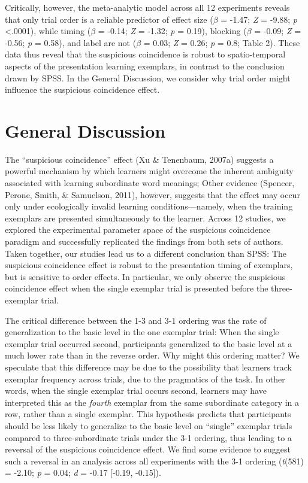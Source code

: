 \documentclass[english,floatsintext,man]{apa6}
\newcounter{author}
\theoremstyle{definition}
\theoremstyle{definition}
\theoremstyle{remark}
\begin{document}
Critically, however, the meta-analytic model across all 12 experiments
reveals that only trial order is a reliable predictor of effect size
(\(\beta\) = -1.47; \emph{Z} = -9.88; \emph{p} \textless{}.0001), while
timing (\(\beta\) = -0.14; \emph{Z} = -1.32; \emph{p} = 0.19), blocking
(\(\beta\) = -0.09; \emph{Z} = -0.56; \emph{p} = 0.58), and label are
not (\(\beta\) = 0.03; \emph{Z} = 0.26; \emph{p} = 0.8; Table 2). These
data thus reveal that the suspicious coincidence is robust to
spatio-temporal aspects of the presentation learning exemplars, in
contrast to the conclusion drawn by SPSS. In the General Discussion, we
consider why trial order might influence the suspicious coincidence
effect.

\section{General Discussion}\label{general-discussion}

The ``suspicious coincidence'' effect (Xu \& Tenenbaum, 2007a) suggests
a powerful mechanism by which learners might overcome the inherent
ambiguity associated with learning subordinate word meanings; Other
evidence (Spencer, Perone, Smith, \& Samuelson, 2011), however, suggests
that the effect may occur only under ecologically invalid learning
conditions---namely, when the training exemplars are presented
simultaneously to the learner. Across 12 studies, we explored the
experimental parameter space of the suspicious coincidence paradigm and
successfully replicated the findings from both sets of authors. Taken
together, our studies lead us to a different conclusion than SPSS: The
suspicious coincidence effect is robust to the presentation timing of
exemplars, but is sensitive to order effects. In particular, we only
observe the suspicious coincidence effect when the single exemplar trial
is presented before the three-exemplar trial.

The critical difference between the 1-3 and 3-1 ordering was the rate of
generalization to the basic level in the one exemplar trial: When the
single exemplar trial occurred second, participants generalized to the
basic level at a much lower rate than in the reverse order. Why might
this ordering matter? We speculate that this difference may be due to
the possibility that learners track exemplar frequency across trials,
due to the pragmatics of the task. In other words, when the single
exemplar trial occurs second, learners may have interpreted this as the
\emph{fourth} exemplar from the same subordinate category in a row,
rather than a single exemplar. This hypothesis predicts that
participants should be less likely to generalize to the basic level on
\enquote{single} exemplar trials compared to three-subordinate trials
under the 3-1 ordering, thus leading to a reversal of the suspicious
coincidence effect. We find some evidence to suggest such a reversal in
an analysis across all experiments with the 3-1 ordering (\emph{t}(581)
= -2.10; \emph{p} = 0.04; \emph{d} = -0.17 {[}-0.19, -0.15{]}).
\end{document}
